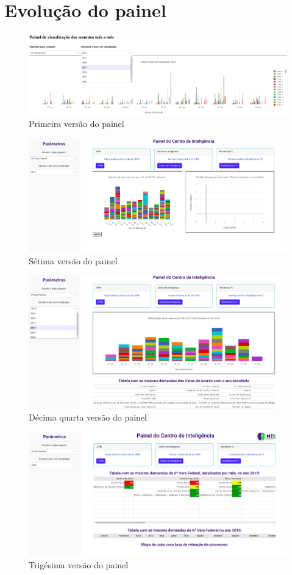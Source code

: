 \chapter{Evolução do painel}

\begin{figure}[h]
	\centering
	\includegraphics[scale=0.30,angle = 270 ]{./figures/cap3/painel1.png}
	\caption{Primeira versão do painel}
\end{figure}

\begin{figure}[h]
	\centering
	\includegraphics[scale=0.30,angle = 270 ]{./figures/cap3/painel2.png}
	\caption{Sétima versão do painel}
\end{figure}

\begin{figure}[h]
	\centering
	\includegraphics[scale=0.30,angle = 270 ]{./figures/cap3/painel3.png}
	\caption{Décima quarta versão do painel}
\end{figure}

\begin{figure}[h]
	\centering
	\includegraphics[scale=0.30,angle = 270 ]{./figures/cap3/painel4.png}
	\caption{Trigésima versão do painel}
\end{figure}